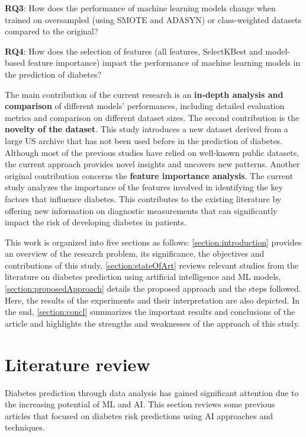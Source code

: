 \documentclass[runningheads]{llncs}
\begin{document}
\textbf{RQ3}: How does the performance of machine learning models change when trained on oversampled (using SMOTE and ADASYN) or class-weighted datasets compared to the original?

\textbf{RQ4}: How does the selection of features (all features, SelectKBest and model-based feature importance) impact the performance of machine learning models in the prediction of diabetes?

 The main contribution of the current research is an \textbf{in-depth analysis and comparison} of different models' performances, including detailed evaluation metrics and comparison on different dataset sizes. 
The second contribution is the \textbf{novelty of the dataset}. This study introduces a new dataset derived from a large US archive that has not been used before in the prediction of diabetes. Although most of the previous studies have relied on well-known public datasets, the current approach provides novel insights and uncovers new patterns. 
Another original contribution concerns the \textbf{feature importance analysis}. The current study analyzes the importance of the features involved in identifying the key factors that influence diabetes. This contributes to the existing literature by offering new information on diagnostic measurements that can significantly impact the risk of developing diabetes in patients.

This work is organized into five sections as follows: \autoref{section:introduction} provides an overview of the research problem, its significance, the objectives and contributions of this study, \autoref{section:stateOfArt} reviews relevant studies from the literature on diabetes prediction using artificial intelligence and ML models, \autoref{section:proposedApproach} details the proposed approach and the steps followed. Here, the results of the experiments and their interpretation are also depicted.
In the end, \autoref{section:concl} summarizes the important results and conclusions of the article and highlights the strengths and weaknesses of the approach of this study.

\section{Literature review}
\label{section:stateOfArt}

Diabetes prediction through data analysis has gained significant attention due to the increasing potential of ML and AI. 
This section reviews some previous articles that focused on diabetes risk predictions using AI approaches and techniques.
\end{document}
